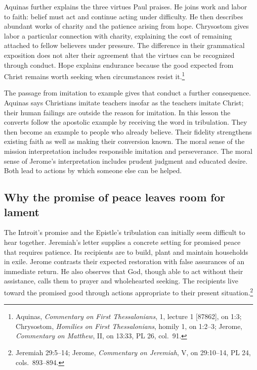 Aquinas further explains the three virtues Paul praises. He joins work and labor to faith: belief must act and continue acting under difficulty. He then describes abundant works of charity and the patience arising from hope. Chrysostom gives labor a particular connection with charity, explaining the cost of remaining attached to fellow believers under pressure. The difference in their grammatical exposition does not alter their agreement that the virtues can be recognized through conduct. Hope explains endurance because the good expected from Christ remains worth seeking when circumstances resist it.\footnote{Aquinas, \textit{Commentary on First Thessalonians}, 1, lecture 1 [87862], on 1:3; Chrysostom, \textit{Homilies on First Thessalonians}, homily 1, on 1:2--3; Jerome, \textit{Commentary on Matthew}, II, on 13:33, PL 26, col.~91.}

The passage from imitation to example gives that conduct a further consequence. Aquinas says Christians imitate teachers insofar as the teachers imitate Christ; their human failings are outside the reason for imitation. In this lesson the converts follow the apostolic example by receiving the word in tribulation. They then become an example to people who already believe. Their fidelity strengthens existing faith as well as making their conversion known. The moral sense of the mission interpretation includes responsible imitation and perseverance. The moral sense of Jerome's interpretation includes prudent judgment and educated desire. Both lead to actions by which someone else can be helped.

\subsection{Why the promise of peace leaves room for lament}

The Introit's promise and the Epistle's tribulation can initially seem difficult to hear together. Jeremiah's letter supplies a concrete setting for promised peace that requires patience. Its recipients are to build, plant and maintain households in exile. Jerome contrasts their expected restoration with false assurances of an immediate return. He also observes that God, though able to act without their assistance, calls them to prayer and wholehearted seeking. The recipients live toward the promised good through actions appropriate to their present situation.\footnote{Jeremiah 29:5--14; Jerome, \textit{Commentary on Jeremiah}, V, on 29:10--14, PL 24, cols.~893--894.}

